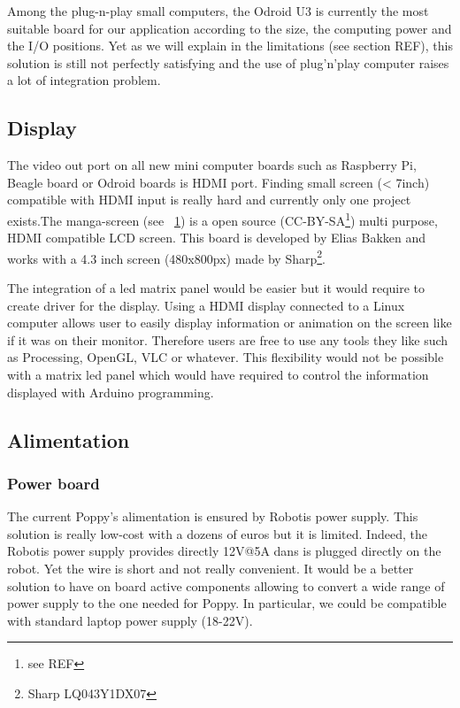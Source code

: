 Among the plug-n-play small computers, the Odroid U3 is currently the most suitable board for our application according to the size, the computing power and the I/O positions.
Yet as we will explain in the limitations (see section REF), this solution is still not perfectly satisfying and the use of plug'n'play computer raises a lot of integration problem.

\subsection{Display} %

The video out port on all new mini computer boards such as Raspberry Pi, Beagle board or Odroid boards is HDMI port. Finding small screen (< 7inch) compatible with HDMI input is really hard and currently only one project exists.The manga-screen (see \figurename~\ref{fig:manga-screen}) is a open source (CC-BY-SA\footnote{see REF}) multi purpose, HDMI compatible LCD screen. This board is developed by Elias Bakken and works with a 4.3 inch screen (480x800px) made by Sharp\footnote{Sharp LQ043Y1DX07}.

\begin{figure}[ht]
\centering
    \hfil
    \caption{}
    \label{fig:manga-screen}
\end{figure}

The integration of a led matrix panel would be easier but it would require to create driver for the display.
Using a HDMI display connected to a Linux computer allows user to easily display information or animation on the screen like if it was on their monitor. Therefore users are free to use any tools they like such as Processing, OpenGL, VLC or whatever. This flexibility would not be possible with a matrix led panel which would have required to control the information displayed with Arduino programming.

\subsection{Alimentation} %
\label{ssub:alimentation}

\subsubsection{Power board} %
The current Poppy's alimentation is ensured by Robotis power supply. This solution is really low-cost with a dozens of euros but it is limited. Indeed, the Robotis power supply provides directly 12V@5A dans is plugged directly on the robot. Yet the wire is short and not really convenient. It would be a better solution to have on board active components allowing to convert a wide range of power supply to the one needed for Poppy. In particular, we could be compatible with standard laptop power supply (18-22V).

